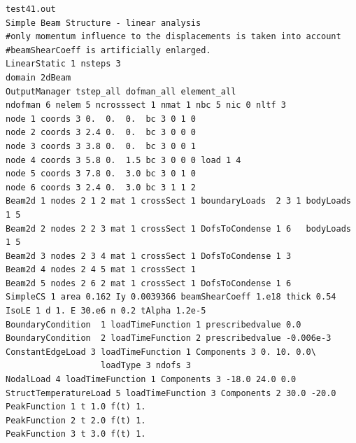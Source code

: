 \documentclass[a4paper]{article}
\begin{document}
{\small\begin{verbatim}
test41.out
Simple Beam Structure - linear analysis
#only momentum influence to the displacements is taken into account
#beamShearCoeff is artificially enlarged.
LinearStatic 1 nsteps 3
domain 2dBeam
OutputManager tstep_all dofman_all element_all
ndofman 6 nelem 5 ncrosssect 1 nmat 1 nbc 5 nic 0 nltf 3
node 1 coords 3 0.  0.  0.  bc 3 0 1 0
node 2 coords 3 2.4 0.  0.  bc 3 0 0 0
node 3 coords 3 3.8 0.  0.  bc 3 0 0 1
node 4 coords 3 5.8 0.  1.5 bc 3 0 0 0 load 1 4
node 5 coords 3 7.8 0.  3.0 bc 3 0 1 0
node 6 coords 3 2.4 0.  3.0 bc 3 1 1 2
Beam2d 1 nodes 2 1 2 mat 1 crossSect 1 boundaryLoads  2 3 1 bodyLoads 1 5
Beam2d 2 nodes 2 2 3 mat 1 crossSect 1 DofsToCondense 1 6   bodyLoads 1 5
Beam2d 3 nodes 2 3 4 mat 1 crossSect 1 DofsToCondense 1 3
Beam2d 4 nodes 2 4 5 mat 1 crossSect 1
Beam2d 5 nodes 2 6 2 mat 1 crossSect 1 DofsToCondense 1 6
SimpleCS 1 area 0.162 Iy 0.0039366 beamShearCoeff 1.e18 thick 0.54
IsoLE 1 d 1. E 30.e6 n 0.2 tAlpha 1.2e-5
BoundaryCondition  1 loadTimeFunction 1 prescribedvalue 0.0
BoundaryCondition  2 loadTimeFunction 2 prescribedvalue -0.006e-3
ConstantEdgeLoad 3 loadTimeFunction 1 Components 3 0. 10. 0.0\
                   loadType 3 ndofs 3
NodalLoad 4 loadTimeFunction 1 Components 3 -18.0 24.0 0.0
StructTemperatureLoad 5 loadTimeFunction 3 Components 2 30.0 -20.0
PeakFunction 1 t 1.0 f(t) 1.
PeakFunction 2 t 2.0 f(t) 1.
PeakFunction 3 t 3.0 f(t) 1.
\end{verbatim}}
\end{document}
